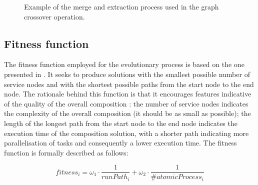 \documentclass{article}
\begin{document}
\begin{figure}
\centerline{
}
\caption{Example of the merge and extraction process used in the graph crossover operation.}
\label{fig:crossoverExample}
\end{figure}

\subsection{Fitness function}
The fitness function employed for the evolutionary process is based on the one presented in \cite{rodriguez2010composition}. It seeks to
produce solutions with the smallest possible number of service nodes and with the shortest possible paths from the start node to the
end node. The rationale behind this function is that it encourages features indicative of the quality of the overall composition \cite{rodriguez2010composition}:
the number of service nodes indicates the complexity of the overall composition (it should be as small as possible); the length of
the longest path from the start node to the end node indicates the execution time of the composition solution, with a shorter
path indicating more parallelisation of tasks and consequently a lower execution time. The fitness function is formally described as follows:

\begin{equation}
 fitness_i = \omega_1 \cdot \frac{1}{runPath_i} + \omega_2 \cdot \frac{1}{\#atomicProcess_i}
\end{equation}
\end{document}
